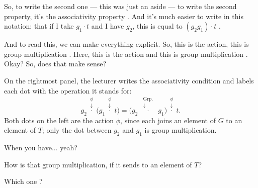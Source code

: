 \begin{speech}[00:46:41 - 00:47:23]
So, to write the second one --- this was just an aside --- to write the second property, it's the associativity property . And it's much easier to write in this notation: that if I take $g_1 \cdot t$ and I have $g_2$, this is equal to $(g_2 g_1) \cdot t$ .

And to read this, we can make everything explicit. So, this is the action, this is group multiplication . Here, this is the action and this is group multiplication . Okay? So, does that make sense?
\end{speech}

\begin{content}
On the rightmost panel, the lecturer writes the associativity condition and labels each dot with the operation it stands for:
\[
g_2 \overset{\substack{\phi\\\downarrow}}{\cdot} \bigl(g_1 \overset{\substack{\phi\\\downarrow}}{\cdot} t\bigr)
=
\bigl(g_2 \; \overset{\substack{\text{Grp.}\\\downarrow}}{\cdot} \; g_1\bigr) \overset{\substack{\phi\\\downarrow}}{\cdot} t.
\]
Both dots on the left are the action $\phi$, since each joins an element of $G$ to an element of $T$; only the dot between $g_2$ and $g_1$ is group multiplication.
\end{content}

\begin{speech}[00:47:24 - 00:47:25]
When you have... yeah?
\end{speech}

\begin{student}
How is that group multiplication, if it sends to an element of $T$?
\end{student}

\begin{speech}[00:47:29 - 00:47:30]
Which one ?
\end{speech}

